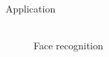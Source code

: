 \documentclass[10pt]{beamer}
\begin{document}
\begin{frame}{Application}
	\begin{figure}[h]
			\\ Face recognition 
	\end{figure}
\end{frame}
\end{document}

